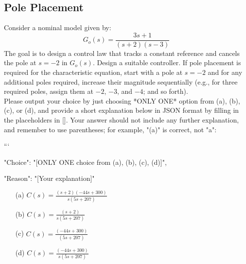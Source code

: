 \documentclass[12pt]{article}
\begin{document}
\subsection{Pole Placement}

Consider a nominal model given by:
\begin{equation}
G_o(s) = \frac{3s + 1}{(s + 2)(s - 3)}
\end{equation}
The goal is to design a control law that tracks a constant reference and cancels the pole at \(s = -2\) in \(G_o(s)\). Design a suitable controller. If pole placement is required for the characteristic equation, start with a pole at \(s = -2\) and for any additional poles required, increase their magnitude sequentially (e.g., for three required poles, assign them at \(-2\), \(-3\), and \(-4\); and so forth).\\
Please output your choice by just choosing *ONLY ONE* option from (a), (b), (c), or (d), and provide a short explanation below in JSON format by filling in the placeholders in []. Your answer should not include any further explanation, and remember to use parentheses; for example, "(a)" is correct, not "a":

```
{

"Choice": "[ONLY ONE choice from (a), (b), (c), (d)]",

"Reason": "[Your explanation]"

}

\begin{itemize}
    \item[(a)] \(C(s) = \frac{(s+2)(-44s+300)}{s(5s+207)}\)
    \item[(b)] \(C(s) = \frac{(s+2)}{s(5s+207)}\)
    \item[(c)] \(C(s) = \frac{(-44s+300)}{(5s+207)}\)
    \item[(d)] \(C(s) = \frac{(-44s+300)}{s(5s+207)}\)
\end{itemize}
\end{document}
